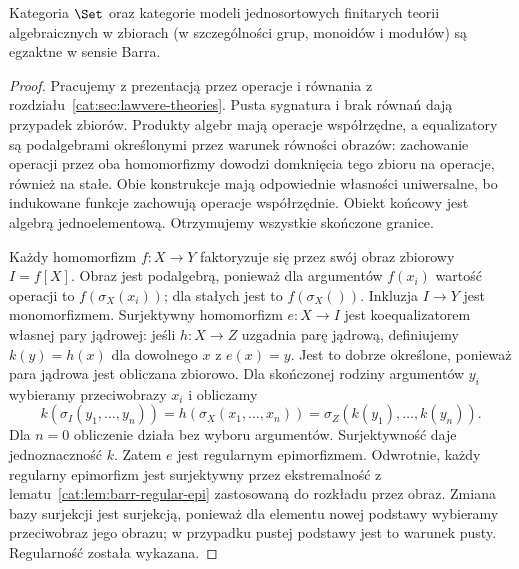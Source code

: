 \begin{twierdzenie}\label{cat:thm:barr-varieties}
Kategoria $\Set$ oraz kategorie modeli jednosortowych finitarych teorii algebraicznych w zbiorach (w szczególności grup, monoidów i modułów) są egzaktne w sensie Barra.
\end{twierdzenie}
\begin{proof}
Pracujemy z prezentacją przez operacje i równania z rozdziału~\ref{cat:sec:lawvere-theories}. Pusta sygnatura i brak równań dają przypadek zbiorów. Produkty algebr mają operacje współrzędne, a equalizatory są podalgebrami określonymi przez warunek równości obrazów: zachowanie operacji przez oba homomorfizmy dowodzi domknięcia tego zbioru na operacje, również na stałe. Obie konstrukcje mają odpowiednie własności uniwersalne, bo indukowane funkcje zachowują operacje współrzędnie. Obiekt końcowy jest algebrą jednoelementową. Otrzymujemy wszystkie skończone granice.

Każdy homomorfizm $f:X\to Y$ faktoryzuje się przez swój obraz zbiorowy $I=f[X]$. Obraz jest podalgebrą, ponieważ dla argumentów $f(x_i)$ wartość operacji to $f(\sigma_X(x_i))$; dla stałych jest to $f(\sigma_X())$. Inkluzja $I\to Y$ jest monomorfizmem. Surjektywny homomorfizm $e:X\to I$ jest koequalizatorem własnej pary jądrowej: jeśli $h:X\to Z$ uzgadnia parę jądrową, definiujemy $k(y)=h(x)$ dla dowolnego $x$ z $e(x)=y$. Jest to dobrze określone, ponieważ para jądrowa jest obliczana zbiorowo. Dla skończonej rodziny argumentów $y_i$ wybieramy przeciwobrazy $x_i$ i obliczamy
\[
 k(\sigma_I(y_1,\ldots,y_n))
 =h(\sigma_X(x_1,\ldots,x_n))
 =\sigma_Z(k(y_1),\ldots,k(y_n)).
\]
Dla $n=0$ obliczenie działa bez wyboru argumentów. Surjektywność daje jednoznaczność $k$. Zatem $e$ jest regularnym epimorfizmem. Odwrotnie, każdy regularny epimorfizm jest surjektywny przez ekstremalność z lematu~\ref{cat:lem:barr-regular-epi} zastosowaną do rozkładu przez obraz. Zmiana bazy surjekcji jest surjekcją, ponieważ dla elementu nowej podstawy wybieramy przeciwobraz jego obrazu; w przypadku pustej podstawy jest to warunek pusty. Regularność została wykazana.


\end{proof}
